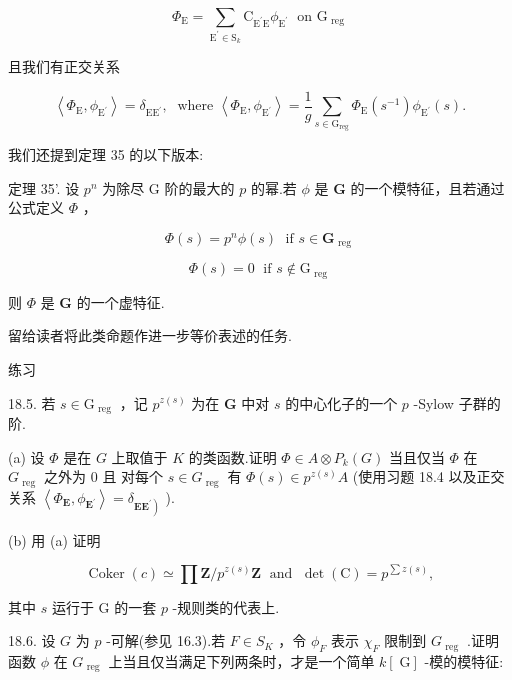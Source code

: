 \documentclass[10pt]{article}
\begin{document}
\[
{\Phi }_{\mathrm{E}} = \mathop{\sum }\limits_{{{\mathrm{E}}^{\prime } \in  {\mathrm{S}}_{k}}}{\mathrm{C}}_{{\mathrm{E}}^{\prime }\mathrm{E}}{\phi }_{{\mathrm{E}}^{\prime }}\;\text{ on }{\mathrm{G}}_{\text{ reg }}
\]

且我们有正交关系

\[
\left\langle  {{\Phi }_{\mathrm{E}},{\phi }_{{\mathrm{E}}^{\prime }}}\right\rangle   = {\delta }_{{\mathrm{{EE}}}^{\prime }},\;\text{ where }\left\langle  {{\Phi }_{\mathrm{E}},{\phi }_{{\mathrm{E}}^{\prime }}}\right\rangle   = \frac{1}{g}\mathop{\sum }\limits_{{s \in  {\mathrm{G}}_{\mathrm{{reg}}}}}{\Phi }_{\mathrm{E}}\left( {s}^{-1}\right) {\phi }_{{\mathrm{E}}^{\prime }}\left( s\right) .
\]

我们还提到定理 35 的以下版本:

定理 35’. 设 \({p}^{n}\) 为除尽 G 阶的最大的 \(p\) 的幂.若 \(\phi\) 是 \(\mathbf{G}\) 的一个模特征，且若通过公式定义 \(\Phi\) ，

\[
\Phi \left( s\right)  = {p}^{n}\phi \left( s\right) \;\text{ if }s \in  {\mathbf{G}}_{\text{ reg }}
\]

\[
\Phi \left( s\right)  = 0\;\text{ if }s \notin  {\mathrm{G}}_{\text{ reg }}
\]

则 \(\Phi\) 是 \(\mathbf{G}\) 的一个虚特征.

留给读者将此类命题作进一步等价表述的任务.

练习

18.5. 若 \(s \in  {\mathrm{G}}_{\text{ reg }}\) ，记 \({p}^{z\left( s\right) }\) 为在 \(\mathbf{G}\) 中对 \(s\) 的中心化子的一个 \(p\) -Sylow 子群的阶.

(a) 设 \(\Phi\) 是在 \(G\) 上取值于 \(K\) 的类函数.证明 \(\Phi  \in  A \otimes  {P}_{k}\left( G\right)\) 当且仅当 \(\Phi\) 在 \({G}_{\text{ reg }}\) 之外为 0 且 对每个 \(s \in  {G}_{\text{ reg }}\) 有 \(\Phi \left( s\right)  \in  {p}^{z\left( s\right) }A\) (使用习题 18.4 以及正交关系 \(\left\langle  {{\Phi }_{\mathbf{E}},{\phi }_{{\mathbf{E}}^{\prime }}}\right\rangle   = {\delta }_{\left. \mathbf{E}{\mathbf{E}}^{\prime }\right) }\) ).

(b) 用 (a) 证明

\[
\operatorname{Coker}\left( c\right)  \simeq  \prod \mathbf{Z}/{p}^{z\left( s\right) }\mathbf{Z}\;\text{ and }\;\det \left( \mathrm{C}\right)  = {p}^{\sum z\left( s\right) },
\]

其中 \(s\) 运行于 G 的一套 \(p\) -规则类的代表上.

18.6. 设 \(G\) 为 \(p\) -可解(参见 16.3).若 \(F \in  {S}_{K}\) ，令 \({\phi }_{F}\) 表示 \({\chi }_{F}\) 限制到 \({G}_{\text{ reg }}\) .证明函数 \(\phi\) 在 \({G}_{\text{ reg }}\) 上当且仅当满足下列两条时，才是一个简单 \(k\left\lbrack  \mathrm{\;G}\right\rbrack\) -模的模特征:
\end{document}

